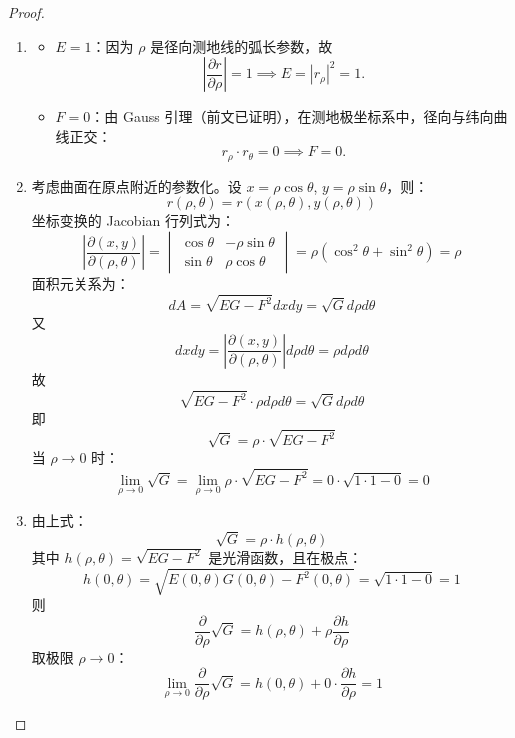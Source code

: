\documentclass[lang=cn,10pt,thmcnt=section]{elegantbook}
\begin{document}
\begin{proof}
    \begin{enumerate}
        \item \begin{itemize}
            \item \( E = 1 \)：因为 \(\rho\) 是径向测地线的弧长参数，故
            \[
            \left| \frac{\partial r}{\partial \rho} \right| = 1 \implies E = \left| r_\rho \right|^2 = 1.
            \]
            \item \( F = 0 \)：由 Gauss 引理（前文已证明），在测地极坐标系中，径向与纬向曲线正交：
            \[
            r_\rho \cdot r_\theta = 0 \implies F = 0.
            \]
        \end{itemize}
        \item  考虑曲面在原点附近的参数化。设 \( x = \rho \cos \theta \), \( y = \rho \sin \theta \)，则：
        \[
        r(\rho, \theta) = r(x(\rho, \theta), y(\rho, \theta))
        \]
        坐标变换的 Jacobian 行列式为：
        \[
        \left| \frac{\partial (x, y)}{\partial (\rho, \theta)} \right| = \begin{vmatrix}
        \cos \theta & -\rho \sin \theta \\
        \sin \theta & \rho \cos \theta
        \end{vmatrix} = \rho (\cos^2 \theta + \sin^2 \theta) = \rho
        \]
        面积元关系为：
        \[
        dA = \sqrt{EG - F^2}  dx  dy = \sqrt{G}  d\rho  d\theta
        \]
        又
        \[
        dx  dy = \left| \frac{\partial (x, y)}{\partial (\rho, \theta)} \right| d\rho  d\theta = \rho  d\rho  d\theta
        \]
        故
        \[
        \sqrt{EG - F^2} \cdot \rho  d\rho  d\theta = \sqrt{G}  d\rho  d\theta
        \]
        即
        \[
        \sqrt{G} = \rho \cdot \sqrt{EG - F^2}
        \]
        当 \(\rho \to 0\) 时：
        \[
        \lim_{\rho \to 0} \sqrt{G} = \lim_{\rho \to 0} \rho \cdot \sqrt{EG - F^2} = 0 \cdot \sqrt{1 \cdot 1 - 0} = 0
        \]

        \item 由上式：\[
\sqrt{G} = \rho \cdot h(\rho, \theta)
\]
其中 \( h(\rho, \theta) = \sqrt{EG - F^2} \) 是光滑函数，且在极点：
\[
h(0, \theta) = \sqrt{E(0,\theta)G(0,\theta) - F^2(0,\theta)} = \sqrt{1 \cdot 1 - 0} = 1
\]
则
\[
\frac{\partial}{\partial \rho} \sqrt{G} = h(\rho, \theta) + \rho \frac{\partial h}{\partial \rho}
\]
取极限 \(\rho \to 0\)：
\[
\lim_{\rho \to 0} \frac{\partial}{\partial \rho} \sqrt{G} = h(0, \theta) + 0 \cdot \frac{\partial h}{\partial \rho} = 1
\]

    \end{enumerate}
\end{proof}
\end{document}
